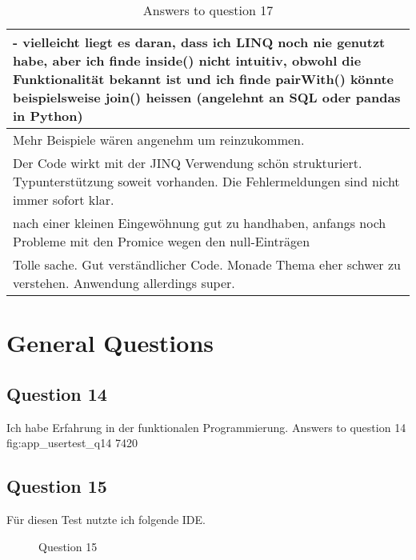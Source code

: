 \begin{table}[H]
\begin{tabularx}{\textwidth}{| X |}
    - vielleicht liegt es daran, dass ich LINQ noch nie genutzt habe, aber ich finde inside() nicht intuitiv, obwohl die Funktionalität bekannt ist und ich finde pairWith() könnte beispielsweise join() heissen (angelehnt an SQL oder pandas in Python) \\ \hline 
    Mehr Beispiele wären angenehm um reinzukommen. \\ \hline 
    Der Code wirkt mit der JINQ Verwendung schön strukturiert. Typunterstützung soweit vorhanden. Die Fehlermeldungen sind nicht immer sofort klar. \\ \hline 
    nach einer kleinen Eingewöhnung gut zu handhaben, anfangs noch Probleme mit den Promice wegen den null-Einträgen \\ \hline 
    Tolle sache. Gut verständlicher Code. Monade Thema eher schwer zu verstehen. Anwendung allerdings super. \\ \hline 
  \end{tabularx}
  \caption{Answers to question 17}
  \label{tab:app_usertest_q17}
\end{table}

\section{General Questions} %
\label{sec:General Questions}

\subsection*{Question 14}
\label{sub:ut_q14}
Ich habe Erfahrung in der funktionalen Programmierung.
\likertbarchart
  {Answers to question 14}
  {fig:app_usertest_q14}
  {7}{4}{2}{0}
  
\subsection*{Question 15}
\label{sub:ut_q15}
Für diesen Test nutzte ich folgende IDE.
\begin{figure}[H]
  \centering
  \caption{Question 15}
  \label{fig:app_usertest_q15}
\end{figure}
